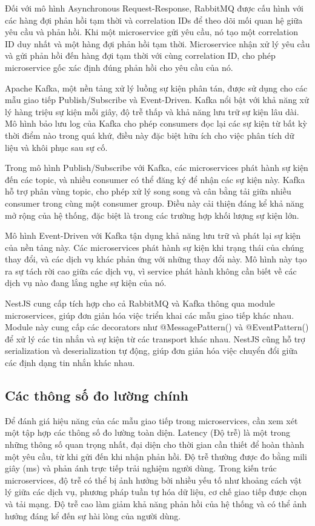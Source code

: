Đối với mô hình Asynchronous Request-Response, RabbitMQ được cấu hình với các hàng đợi phản hồi tạm thời và correlation IDs để theo dõi mối quan hệ giữa yêu cầu và phản hồi. Khi một microservice gửi yêu cầu, nó tạo một correlation ID duy nhất và một hàng đợi phản hồi tạm thời. Microservice nhận xử lý yêu cầu và gửi phản hồi đến hàng đợi tạm thời với cùng correlation ID, cho phép microservice gốc xác định đúng phản hồi cho yêu cầu của nó.

Apache Kafka, một nền tảng xử lý luồng sự kiện phân tán, được sử dụng cho các mẫu giao tiếp Publish/Subscribe và Event-Driven. Kafka nổi bật với khả năng xử lý hàng triệu sự kiện mỗi giây, độ trễ thấp và khả năng lưu trữ sự kiện lâu dài. Mô hình bảo lưu log của Kafka cho phép consumers đọc lại các sự kiện từ bất kỳ thời điểm nào trong quá khứ, điều này đặc biệt hữu ích cho việc phân tích dữ liệu và khôi phục sau sự cố.

Trong mô hình Publish/Subscribe với Kafka, các microservices phát hành sự kiện đến các topic, và nhiều consumer có thể đăng ký để nhận các sự kiện này. Kafka hỗ trợ phân vùng topic, cho phép xử lý song song và cân bằng tải giữa nhiều consumer trong cùng một consumer group. Điều này cải thiện đáng kể khả năng mở rộng của hệ thống, đặc biệt là trong các trường hợp khối lượng sự kiện lớn.

Mô hình Event-Driven với Kafka tận dụng khả năng lưu trữ và phát lại sự kiện của nền tảng này. Các microservices phát hành sự kiện khi trạng thái của chúng thay đổi, và các dịch vụ khác phản ứng với những thay đổi này. Mô hình này tạo ra sự tách rời cao giữa các dịch vụ, vì service phát hành không cần biết về các dịch vụ nào đang lắng nghe sự kiện của nó.

NestJS cung cấp tích hợp cho cả RabbitMQ và Kafka thông qua module microservices, giúp đơn giản hóa việc triển khai các mẫu giao tiếp khác nhau. Module này cung cấp các decorators như @MessagePattern() và @EventPattern() để xử lý các tin nhắn và sự kiện từ các transport khác nhau. NestJS cũng hỗ trợ serialization và deserialization tự động, giúp đơn giản hóa việc chuyển đổi giữa các định dạng tin nhắn khác nhau.

\subsection{Các thông số đo lường chính}
Để đánh giá hiệu năng của các mẫu giao tiếp trong microservices, cần xem xét một tập hợp các thông số đo lường toàn diện. Latency (Độ trễ) là một trong những thông số quan trọng nhất, đại diện cho thời gian cần thiết để hoàn thành một yêu cầu, từ khi gửi đến khi nhận phản hồi. Độ trễ thường được đo bằng mili giây (ms) và phản ánh trực tiếp trải nghiệm người dùng. Trong kiến trúc microservices, độ trễ có thể bị ảnh hưởng bởi nhiều yếu tố như khoảng cách vật lý giữa các dịch vụ, phương pháp tuần tự hóa dữ liệu, cơ chế giao tiếp được chọn và tải mạng. Độ trễ cao làm giảm khả năng phản hồi của hệ thống và có thể ảnh hưởng đáng kể đến sự hài lòng của người dùng.

